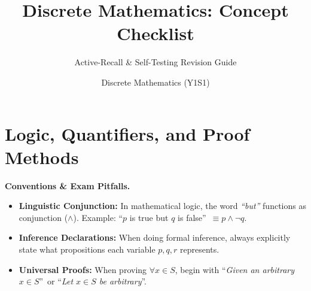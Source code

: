 \documentclass{natsirt}
\title{Discrete Mathematics: Concept Checklist}
\author{Discrete Mathematics (Y1S1)}
\subtitle{Active-Recall \& Self-Testing Revision Guide}
\newenvironment{warningbox}[1][]{\begin{whitebox}[#1]\textbf{Conventions \& Exam Pitfalls. }}{\end{whitebox}}
\newcommand{\citem}{\item[$\square$]}
\begin{document}
\section{Logic, Quantifiers, and Proof Methods}

\begin{warningbox}
    \begin{itemize}
        \citem \textbf{Linguistic Conjunction:} In mathematical logic, the word \emph{\textquotedblleft but\textquotedblright} functions as conjunction ($\land$). Example: \textquotedblleft$p$ is true but $q$ is false\textquotedblright\ $\equiv p \land \neg q$.
        \citem \textbf{Inference Declarations:} When doing formal inference, always explicitly state what propositions each variable $p, q, r$ represents.
        \citem \textbf{Universal Proofs:} When proving $\forall x \in S$, begin with \textquotedblleft\emph{Given an arbitrary $x \in S$}\textquotedblright\ or \textquotedblleft\emph{Let $x \in S$ be arbitrary}\textquotedblright.
    \end{itemize}
\end{warningbox}
\end{document}
